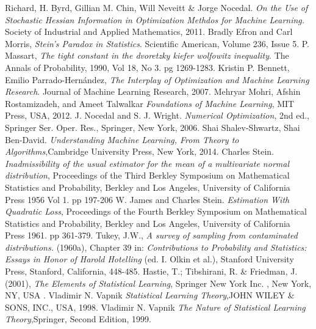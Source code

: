 \documentclass{book}
\theoremstyle{plain}
\theoremstyle{definition}
\theoremstyle{remark}
\begin{document}
\begin{thebibliography}{9}
 Richard, H. Byrd, Gillian M. Chin, Will Neveitt \& Jorge Nocedal.
  \emph{On the Use of Stochastic Hessian Information in Optimization Methdos for Machine Learning.} Society of Industrial and Applied Mathematics, 2011.
 Bradly Efron and Carl Morris, \emph{Stein's Paradox in Statistics}. Scientific American, Volume 236, Issue 5.
 P. Massart, \emph{The tight constant in the dvoretzky kiefer wolfowitz inequality}. The Annals of Probability, 1990, Vol 18, No 3. pg 1269-1283. 
 Kristin P. Bennett, Emilio Parrado-Hernández, \emph{The Interplay of Optimization and Machine Learning Research}. Journal of Machine Learning Research, 2007.
 Mehryar Mohri, Afshin Rostamizadeh, and Ameet Talwalkar
  \emph{Foundations of Machine Learning}, MIT Press, USA, 2012.
 J. Nocedal and S. J. Wright. \emph{Numerical Optimization}, 2nd ed., Springer Ser. Oper. Res., Springer, New York, 2006.
 Shai Shalev-Shwartz, Shai Ben-David. \emph{Understanding Machine Learning, From Theory to Algorithms},Cambridge University Press, New York, 2014.
 Charles Stein. \emph{Inadmissibility of the usual estimator for the mean of a multivariate normal distribution}, Proceedings of the Third Berkley Symposium on Mathematical Statistics and Probability, Berkley and Los Angeles, University of California Press 1956 Vol 1. pp 197-206
 W. James and Charles Stein. \emph{Estimation With Quadratic Loss},  Proceedings of the Fourth Berkley Symposium on Mathematical Statistics and Probability, Berkley and Los Angeles, University of California Press 1961. pp 361-379.
 Tukey, J.W., \emph{A survey of sampling from contaminated distributions.} (1960a), Chapter 39 in: \emph{Contributions to Probability and Statistics: Essays in Honor of Harold Hotelling} (ed. I. Olkin et al.), Stanford University Press, Stanford, California, 448-485.
 Hastie, T.; Tibshirani, R. \& Friedman, J. (2001), \emph{The Elements of Statistical Learning}, Springer New York Inc. , New York, NY, USA .
 Vladimir N. Vapnik  \emph{Statistical Learning Theory},JOHN WILEY \& SONS, INC., USA, 1998.
 Vladimir N. Vapnik  \emph{The Nature of Statistical Learning Theory},Springer, Second Edition, 1999.

\end{thebibliography}
\end{document}
